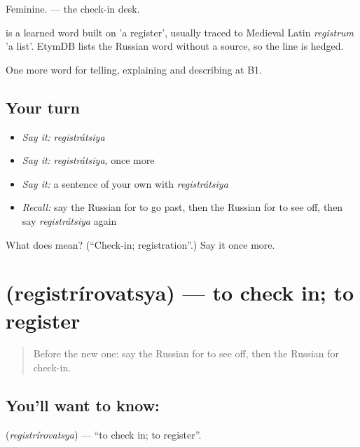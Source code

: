 Feminine. \emph{ } — the check-in desk.

\begin{cousinweb}
\emph{} is a learned word built on \emph{} 'a register', usually traced to Medieval Latin \emph{registrum} 'a list'. EtymDB lists the Russian word without a source, so the line is hedged.
\end{cousinweb}

\begin{grammarlens}[title={What you've built}]
One more word for telling, explaining and describing at B1.
\end{grammarlens}

\subsection*{Your turn}
\begin{itemize}
\raggedright
  \item \emph{Say it:} \emph{registrátsiya}
  \item \emph{Say it:} \emph{registrátsiya}, once more
  \item \emph{Say it:} a sentence of your own with \emph{registrátsiya}
  \item \emph{Recall:} say the Russian for to go past, then the Russian for to see off, then say \emph{registrátsiya} again
\end{itemize}

\begin{tcolorbox}[breakable,colback=teal!4,colframe=teal!35!black,title={Before you move on}]
What does  mean? (\textquotedblleft{}Check-in; registration\textquotedblright{}.) Say it once more.
\end{tcolorbox}
\section[\texorpdfstring{\ru{регистрироваться} (registrírovatsya)}{регистрироваться (registrírovatsya)}]{ (registrírovatsya) — to check in; to register}

\label{lesson:RU-C419-registrirovatsya}



\begin{quote}
Before the new one: say the Russian for to see off, then the Russian for check-in.
\end{quote}

\subsection*{You'll want to know: }
\textbf{} (\emph{registrírovatsya}) — \textquotedblleft{}to check in; to register\textquotedblright{}.

